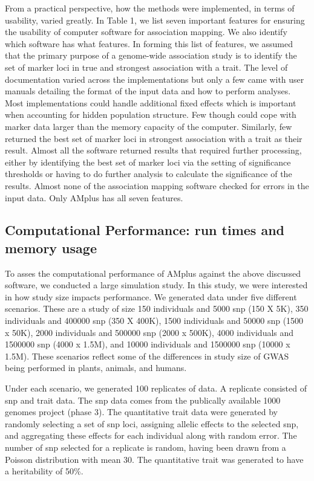 \documentclass[12pt]{article}
\begin{document}
From a practical perspective, how the methods were implemented, in terms of usability, varied greatly. In Table 1, we list seven important features for ensuring the usability of computer software for association mapping. We also identify which software has what features. 
In forming this list of features, we assumed that the primary purpose of a genome-wide association study is 
to identify the set of marker loci in true and strongest association with a trait.  The level of documentation varied across the implementations but only 
a few came with user manuals detailing the format of the input data and how to perform analyses. 
Most implementations could handle additional fixed effects which is important when accounting for hidden population structure. 
Few though could cope with marker data larger than the memory capacity of the computer. Similarly, few returned the best set of marker loci in strongest association with a trait as their result. Almost all the software returned results that required further processing, either 
by identifying the best set of marker loci via the setting of significance thresholds or having to do further analysis to calculate the significance of the results. Almost none of the association mapping software checked for errors in the input data.  Only AMplus has all seven features. 


\subsection{Computational Performance: run times and memory usage}


To asses the computational performance of AMplus against the above discussed software, we conducted a large simulation study. 
In this study, we were interested in how study size impacts performance. We generated data under five different scenarios. 
These are a study of size 150 individuals and 5000 snp (150 X 5K), 350 individuals and 400000 snp (350 X 400K),  1500 individuals and 
50000 snp (1500 x 50K), 2000 individuals and 500000 snp (2000 x 500K), 4000 individuals and 
1500000 snp (4000 x 1.5M), and 10000 individuals and 1500000 snp (10000 x 1.5M).  These scenarios reflect some of the differences in 
study size of GWAS being performed in plants, animals, and humans.   

Under each scenario, we generated 100 replicates of data. A replicate consisted of snp and trait data. 
The snp data comes from the publically available 1000 genomes project (phase 3). The quantitative trait data were generated by randomly selecting a set of snp loci, assigning allelic effects to the selected snp, and aggregating these effects for each individual along with random error. The number of snp selected for a replicate is random, having been drawn from a Poisson distribution with mean 30. The quantitative trait was generated to have a heritability of 50\%.
\end{document}
